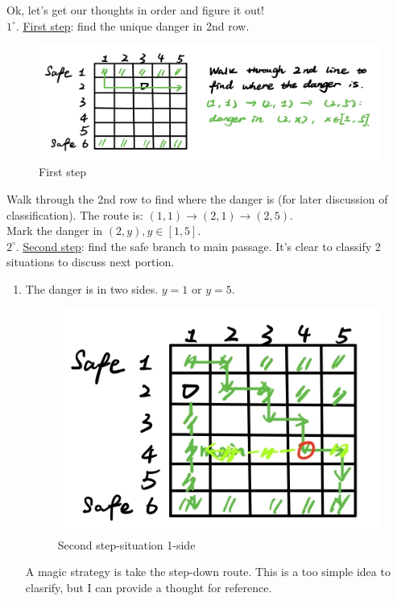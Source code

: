 \documentclass{Math_Note}
\begin{document}
\begin{sol}
\marginpar{\textcolor{green}{solution}}
Ok, let's get our thoughts in order and figure it out! \\
$1^{\circ}.$ \underline{First step}: find the unique danger in 2nd row.
\begin{figure}[H]
    \centering
    \includegraphics[scale=0.25]{"./Figures/Q5F2.png"}
    \caption{First step}
\end{figure}
Walk through the 2nd row to find where the danger is (for later discussion of classification). The route is: $\left(1,1\right)\rightarrow\left(2,1\right)\rightarrow\left(2,5\right)$.\\
Mark the danger in $(2,y), y\in\left[1,5\right]$. \\
$2^{\circ}.$ \underline{Second step}: find the safe branch to main passage.
It's clear to classify 2 situations to discuss next portion. 
\begin{enumerate}
    \item The danger is in two sides. $y=1$ or $y=5$.
    \begin{figure}[H]
        \centering
        \includegraphics[scale=0.25]{"./Figures/Q5F3_1.png"}
        \caption{Second step-situation 1-side}
    \end{figure}
    A magic strategy is take the step-down route. This is a too simple idea to clasrify, but I can provide a thought for reference. \\

\end{enumerate}
\end{sol}
\end{document}
